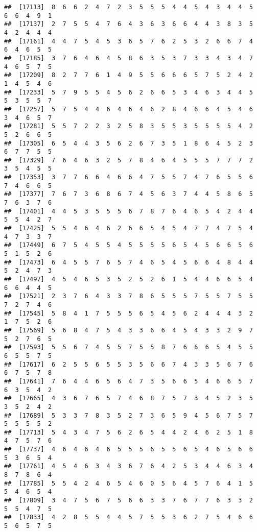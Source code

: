 \documentclass[
]{book}
\begin{document}
\begin{verbatim}
##  [17113]  8  6  6  2  4  7  2  3  5  5  5  4  4  5  4  3  4  4  5  6  6  4  9  1
##  [17137]  2  7  5  5  4  7  6  4  3  6  3  6  6  4  4  3  8  3  5  4  2  4  4  4
##  [17161]  4  4  7  5  4  5  3  6  5  7  6  2  5  3  2  6  6  7  4  6  4  6  5  5
##  [17185]  3  7  6  4  6  4  5  8  6  3  5  3  7  3  3  4  3  4  7  4  6  5  7  5
##  [17209]  8  2  7  7  6  1  4  9  5  5  6  6  6  5  7  5  2  4  2  1  4  5  4  6
##  [17233]  5  7  9  5  5  4  5  6  2  6  6  5  3  4  6  3  4  4  5  5  3  5  5  7
##  [17257]  5  7  5  4  4  6  4  6  4  6  2  8  4  6  6  4  5  4  6  3  4  6  5  7
##  [17281]  5  5  7  2  2  3  2  5  8  3  5  5  3  5  5  5  5  4  2  5  2  6  6  5
##  [17305]  6  5  4  4  3  5  6  2  6  7  3  5  1  8  6  4  5  2  3  6  7  7  5  5
##  [17329]  7  6  4  6  3  2  5  7  8  4  6  4  5  5  5  7  7  7  2  3  5  4  5  5
##  [17353]  3  7  7  6  6  4  6  6  4  7  5  5  7  4  7  6  5  5  6  7  4  6  6  5
##  [17377]  7  6  7  3  6  8  6  7  4  5  6  3  7  4  4  5  8  6  5  7  6  3  7  6
##  [17401]  4  4  5  3  5  5  5  6  7  8  7  6  4  6  5  4  2  4  4  5  5  4  2  7
##  [17425]  5  5  4  6  4  6  2  6  6  5  4  5  4  7  7  4  7  5  4  4  7  3  3  7
##  [17449]  6  7  5  4  5  5  4  5  5  5  5  6  5  4  5  6  6  5  6  5  1  5  2  6
##  [17473]  6  4  5  5  7  6  5  7  4  6  5  4  5  6  6  4  8  4  4  5  2  4  7  3
##  [17497]  4  5  4  6  5  3  5  2  5  2  6  1  5  4  4  6  6  5  4  6  6  4  4  5
##  [17521]  2  3  7  6  4  3  3  7  8  6  5  5  5  7  5  5  7  5  5  7  2  7  4  6
##  [17545]  5  8  4  1  7  5  5  5  6  5  4  5  6  2  4  4  4  3  2  1  7  5  2  6
##  [17569]  5  6  8  4  7  5  4  3  3  6  6  4  5  4  3  3  2  9  7  5  2  7  6  5
##  [17593]  5  5  6  7  4  5  5  7  5  5  8  7  6  6  6  5  4  5  5  6  5  5  7  5
##  [17617]  6  2  5  5  6  5  5  3  5  6  6  7  4  3  3  5  6  7  6  6  7  5  7  8
##  [17641]  7  6  4  4  6  5  6  4  7  3  5  6  6  5  4  6  6  5  7  6  3  5  4  2
##  [17665]  4  3  6  7  6  5  7  4  6  8  7  5  7  3  4  5  2  3  5  3  5  2  4  2
##  [17689]  5  3  3  7  8  3  5  2  7  3  6  5  9  4  5  6  7  5  7  5  5  5  5  2
##  [17713]  5  4  3  4  7  5  6  2  6  5  4  4  2  4  6  2  5  1  8  4  7  5  7  6
##  [17737]  4  6  4  6  4  6  5  5  5  6  5  5  6  5  4  6  5  6  6  5  3  6  5  4
##  [17761]  4  5  4  6  3  4  3  6  7  6  4  2  5  3  4  4  6  3  4  8  7  8  6  4
##  [17785]  5  5  4  2  4  6  5  4  6  0  5  6  4  5  7  6  4  1  5  5  4  6  5  4
##  [17809]  3  4  7  5  6  7  5  6  6  3  3  7  6  7  7  6  3  3  2  5  5  4  7  5
##  [17833]  4  2  8  5  5  4  4  5  7  5  5  3  6  2  7  5  4  6  6  5  6  5  7  5

\end{verbatim}
\end{document}
